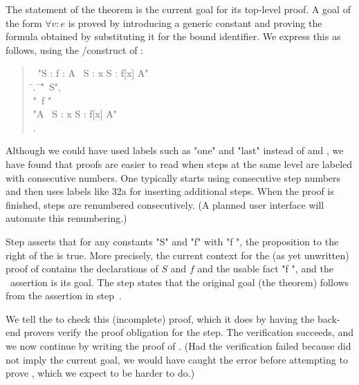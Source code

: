 \documentclass[a4paper]{easychair}
\begin{document}
The statement of the theorem is the current goal for its top-level
proof. A goal of the form $\forall v:e$ is proved by introducing a
generic constant and proving the formula obtained by substituting it
for the bound identifier. We express this as follows, using the
\ASSUME/\PROVE construct of \tlatwo:
\begin{quote} \small
  \begin{tabbing}
    \THEOREM\ "\forall S : \forall f \in [S -> \SUBSET\ S] : 
                \exists A \in \SUBSET\ S : \forall x \in S : f[x] \neq A" \\
    \LSP \= .\ \= \ASSUME \= "\NEW\ S", \\
         \>        \>         \> "\NEW\ f \in [S -> \SUBSET\ S]"\\
         \>        \> \PROVE "\exists A \in \SUBSET\ S : \forall x \in S : f[x] \neq A" \\
         \> .  \> \QED \BY {}
  \end{tabbing}
\end{quote}
Although we could have used labels such as "one" and "last"
instead of  and , we have found that proofs are easier to read
when steps at the same level are labeled with consecutive numbers.
One typically starts using consecutive step numbers and then uses
labels like \s32a for inserting additional steps.  When the proof is
finished, steps are renumbered consecutively.  (A planned user
interface will automate this renumbering.)

Step  asserts that for any constants "S" and "f" with "f \in [S ->
\SUBSET\ S]", the proposition to the right of the \PROVE is true.
More precisely, the current context for the (as yet unwritten) proof
of  contains the declarations of $S$ and $f$ and the usable fact
"f \in [S -> \SUBSET\ S]", and the \PROVE\ assertion is its goal.  The
\QED step states that the original goal (the theorem) follows from the
assertion in step~.

We tell the \PM to check this (incomplete) proof, which it does by
having the back-end provers verify the proof obligation for the \QED
step.  The verification succeeds, and we now continue by writing the
proof of .  (Had the verification failed because  did not
imply the current goal, we would have caught the error before
attempting to prove , which we expect to be harder to do.)
\end{document}
